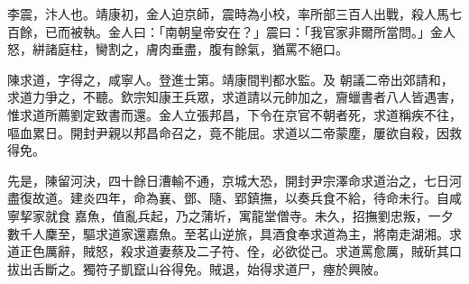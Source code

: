 \begin{pinyinscope}
 李震，汴人也。靖康初，金人迫京師，震時為小校，率所部三百人出戰，殺人馬七百餘，已而被執。金人曰：「南朝皇帝安在？」震曰：「我官家非爾所當問。」金人怒，絣諸庭柱，臠割之，膚肉垂盡，腹有餘氣，猶罵不絕口。



 陳求道，字得之，咸寧人。登進士第。靖康間判都水監。及
 朝議二帝出郊請和，求道力爭之，不聽。欽宗知康王兵眾，求道請以元帥加之，齎蠟書者八人皆遇害，惟求道所薦劉定致書而還。金人立張邦昌，下令在京官不朝者死，求道稱疾不往，嘔血累日。開封尹親以邦昌命召之，竟不能屈。求道以二帝蒙塵，屢欲自殺，因救得免。



 先是，陳留河決，四十餘日漕輸不通，京城大恐，開封尹宗澤命求道治之，七日河盡復故道。建炎四年，命為襄、鄧、隨、郢鎮撫，以奏兵食不給，待命未行。自咸寧挈家就食
 嘉魚，值亂兵起，乃之蒲圻，寓龍堂僧寺。未久，招撫劉忠叛，一夕數千人麇至，驅求道家還嘉魚。至茗山逆旅，具酒食奉求道為主，將南走湖湘。求道正色厲辭，賊怒，殺求道妻蔡及二子符、佺，必欲從己。求道罵愈厲，賊斫其口拔出舌斷之。獨符子凱竄山谷得免。賊退，始得求道尸，瘞於興陂。



\end{pinyinscope}